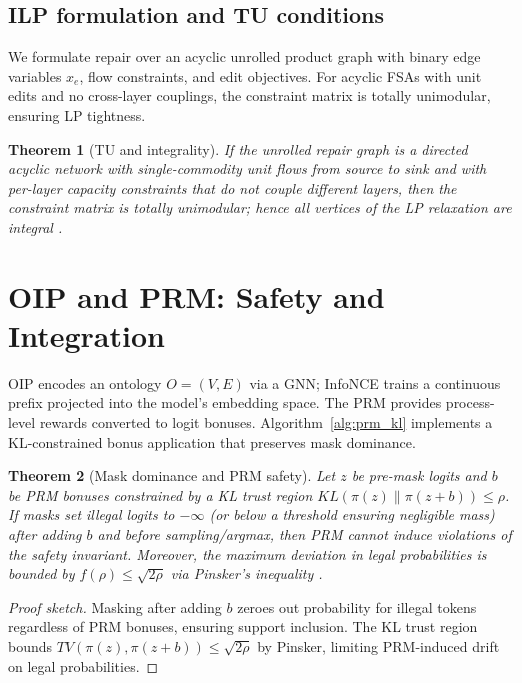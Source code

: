 \documentclass{article}
\def\mathcal#1{#1}%
\def\mathrm#1{#1}%
\newtheorem{theorem}{Theorem}
\begin{document}
\subsection{ILP formulation and TU conditions}
We formulate repair over an acyclic unrolled product graph with binary edge variables $x_e$, flow constraints, and edit objectives. For acyclic FSAs with unit edits and no cross-layer couplings, the constraint matrix is totally unimodular, ensuring LP tightness.

\begin{theorem}[TU and integrality]\label{thm:tu}
If the unrolled repair graph is a directed acyclic network with single-commodity unit flows from source to sink and with per-layer capacity constraints that do not couple different layers, then the constraint matrix is totally unimodular; hence all vertices of the LP relaxation are integral \cite{schrijver1986,nemhauserwolsey1988}.
\end{theorem}

\section{OIP and PRM: Safety and Integration}
OIP encodes an ontology $\mathcal{O}=(V,E)$ via a GNN; InfoNCE trains a continuous prefix projected into the model’s embedding space. The PRM provides process-level rewards converted to logit bonuses. Algorithm~\ref{alg:prm_kl} implements a KL-constrained bonus application that preserves mask dominance.

\begin{theorem}[Mask dominance and PRM safety]\label{thm:prm}
Let $z$ be pre-mask logits and $b$ be PRM bonuses constrained by a KL trust region $\mathrm{KL}(\pi(z)\|\pi(z+b))\le \rho$. If masks set illegal logits to $-\infty$ (or below a threshold ensuring negligible mass) after adding $b$ and before sampling/argmax, then PRM cannot induce violations of the safety invariant. Moreover, the maximum deviation in legal probabilities is bounded by $f(\rho)\le\sqrt{2\rho}$ via Pinsker’s inequality \cite{csiszar2011it}.
\end{theorem}

\begin{proof}[Proof sketch]
Masking after adding $b$ zeroes out probability for illegal tokens regardless of PRM bonuses, ensuring support inclusion. The KL trust region bounds $\mathrm{TV}(\pi(z),\pi(z{+}b))\le \sqrt{2\rho}$ by Pinsker, limiting PRM-induced drift on legal probabilities.
\end{proof}
\end{document}
